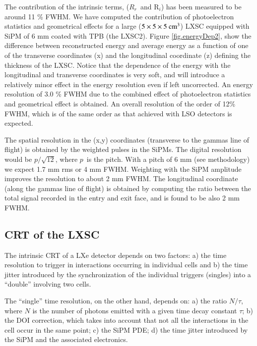 \documentclass[review]{elsarticle}
\begin{document}
The contribution of the intrinsic terms, ($R_r$~and R$_i$) has been measured to be
around 11 \% FWHM\cite{aprileRes}. We have computed the contribution of photoelectron statistics and geometrical effects for a large
($5 \times 5 \times 5 {\rm ~cm^3}$) LXSC equipped with SiPM of 6 mm coated with TPB (the LXSC2).  
Figure \ref{fig.energyDep2}, show the difference between reconstructed energy and average energy as a function of one of the transverse coordinates (x) and the longitudinal coordinate (z) defining the thickness of the LXSC. Notice that the dependence of the energy with the longitudinal and transverse coordinates is very soft, and will introduce a relatively minor effect in the energy resolution even if left uncorrected. An energy resolution of 3.0 \% FWHM due to the combined effect of photoelectron statistics and geometrical effect is obtained. 
An overall resolution of the order of 12\% FWHM, which is of the same order as that achieved with LSO detectors is expected. 

The spatial resolution in the (x,y) coordinates (transverse to the gammas line of flight) is obtained by the weighted pulses in the SiPMs. The digital resolution would be
$p/\sqrt{12}$, where $p$~is the pitch. With a pitch of 6 mm (see methodology) we expect 1.7 mm rms or 4 mm FWHM. Weighting with the SiPM amplitude improves the resolution to about 2 mm FWHM. The longitudinal coordinate (along the gammas line of flight) is obtained by computing the ratio between the
total signal recorded in the entry and exit face, and is found to be also 2 mm FWHM. 


\subsection*{CRT  of the LXSC}

The intrinsic CRT of a LXe detector depends on two factors: a) the time resolution to trigger in interactions occurring in individual cells and b) the time jitter introduced by the synchronization of the individual triggers (singles) into a ``double'' involving two cells. 

The ``single'' time resolution, on the other hand, depends on: a) the ratio $N/\tau$, where $N$ is the number of photons emitted with a given time decay constant $\tau$; b) the DOI correction, which takes into account that not all the interactions in the cell occur in the same point; c) the SiPM PDE; d) the time jitter introduced by the SiPM and the associated electronics. 
\end{document}
